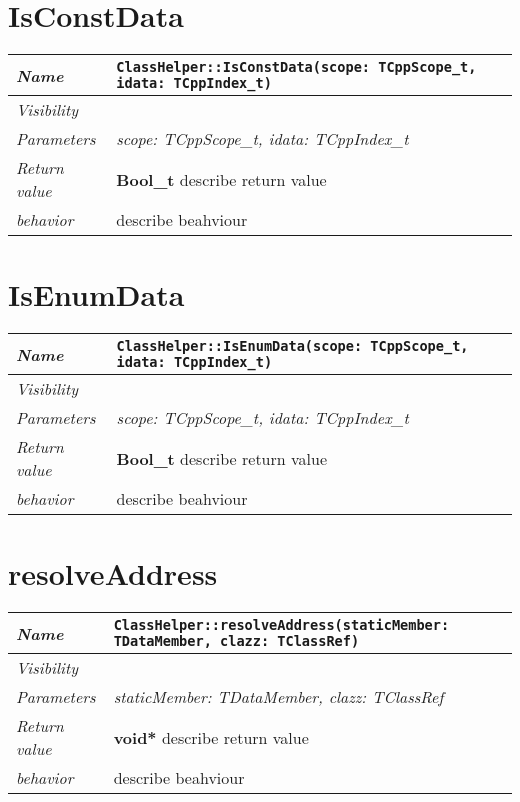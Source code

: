 \section{IsConstData}
\begin{longtable}{p{3cm} @{\hskip 1cm} p{12cm}}
\hline
\textit{Name} & \texttt{ClassHelper::IsConstData(scope: TCppScope_t, idata: TCppIndex_t)}\\
\hline
\textit{Visibility} & \\
\hline
\textit{Parameters} & \textit{scope: TCppScope_t, idata: TCppIndex_t}\\
\hline
\textit{Return value} & \textbf{ Bool_t} describe return value\\
 \hline
\textit{behavior} & describe beahviour \\
\hline
\end{longtable} \pagebreak
\section{IsEnumData}
\begin{longtable}{p{3cm} @{\hskip 1cm} p{12cm}}
\hline
\textit{Name} & \texttt{ClassHelper::IsEnumData(scope: TCppScope_t, idata: TCppIndex_t)}\\
\hline
\textit{Visibility} & \\
\hline
\textit{Parameters} & \textit{scope: TCppScope_t, idata: TCppIndex_t}\\
\hline
\textit{Return value} & \textbf{ Bool_t} describe return value\\
 \hline
\textit{behavior} & describe beahviour \\
\hline
\end{longtable} \pagebreak
\section{resolveAddress}
\begin{longtable}{p{3cm} @{\hskip 1cm} p{12cm}}
\hline
\textit{Name} & \texttt{ClassHelper::resolveAddress(staticMember: TDataMember, clazz: TClassRef)}\\
\hline
\textit{Visibility} & \\
\hline
\textit{Parameters} & \textit{staticMember: TDataMember, clazz: TClassRef}\\
\hline
\textit{Return value} & \textbf{ void*} describe return value\\
 \hline
\textit{behavior} & describe beahviour \\
\hline
\end{longtable} \pagebreak
